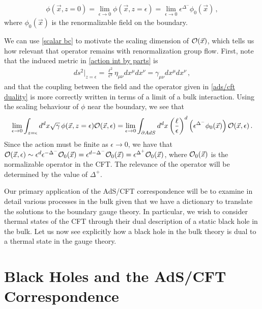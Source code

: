 \documentclass[../PhD.tex]{subfiles}
\begin{document}
\begin{align}
\label{scalar bc}
\phi(\vec x, z=0) = \lim_{\epsilon \to 0} \phi(\vec x, z=\epsilon) = \lim_{\epsilon \to 0} \epsilon^{\Delta^-} \phi_0 (\vec x) \, ,
\end{align}
where $\phi_0 (\vec x)$ is the renormalizable field on the boundary. 

We can use \eqref{scalar bc} to motivate the scaling dimension of $\mathcal O (\vec x)$, which tells us how relevant that operator remains with renormalization group flow. First, note that the induced metric in \eqref{action int by parts} is
\begin{align}
ds^2 \Big|_{z=\epsilon} = \frac{\ell^2}{\epsilon^2} \eta_{\mu \nu} dx^\mu dx^\nu = \gamma_{\mu \nu} dx^\mu dx^\nu \, ,
\end{align}
and that the coupling between the field and the operator given in \eqref{ads/cft duality} is more correctly written in terms of a limit of a bulk interaction. Using the scaling behaviour of $\phi$ near the boundary, we see that
\begin{align}
\lim_{\epsilon \to 0} \int_{z=\epsilon} d^{d}x \sqrt{\gamma} \, \phi(\vec x, z = \epsilon) \mathcal O(\vec x, \epsilon) = \lim_{\epsilon \to 0} \int_{\partial AdS} d^d x \left(\frac{\ell}{\epsilon}\right)^d \left( \epsilon^{\Delta^-} \phi_0 (\vec x) \right) \mathcal O (\vec x, \epsilon) \, .
\end{align}
Since the action must be finite as $\epsilon \to 0$, we have that $ \mathcal O(\vec x, \epsilon) \sim \epsilon^{d} \epsilon^{-\Delta^-} \mathcal O_0 (\vec x) = \epsilon^{d - \Delta^-} \mathcal O_0 (\vec x) = \epsilon^{\Delta^+} \mathcal O_0 (\vec x)$, where $\mathcal O_0(\vec x)$ is the normalizable operator in the CFT. The relevance of the operator will be determined by the value of $\Delta^+$.

Our primary application of the AdS/CFT correspondence will be to examine in detail various processes in the bulk given that we have a dictionary to translate the solutions to the boundary gauge theory. In particular, we wish to consider thermal states of the CFT through their dual description of a static black hole in the bulk. Let us now see explicitly how a black hole in the bulk theory is dual to a thermal state in the gauge theory.


\section{Black Holes and the AdS/CFT Correspondence}
\label{sec: bh in ads}
\end{document}
